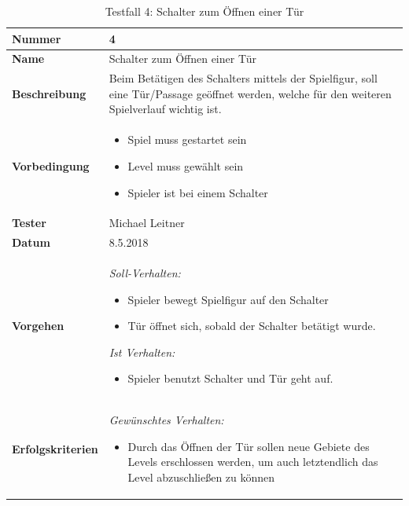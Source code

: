 \begin{table}

	\renewcommand{\arraystretch}{1.5}
	\begin{tabular}{|p{3.5cm}|p{11cm}|}
		
		\hline 
		\textbf{Nummer} & 4 \\ 
		\hline 
		\textbf{Name} & {\large Schalter zum Öffnen einer Tür} \\ 
		\hline 
		\textbf{Beschreibung} & 
		Beim Betätigen des Schalters mittels der Spielfigur, soll eine Tür/Passage geöffnet werden, welche für den weiteren Spielverlauf wichtig ist. \\ 
		\hline 
		\textbf{Vorbedingung} & 
		\begin{itemize}
			\setlength{\itemsep}{1pt}
			\setlength{\parskip}{0.5pt}
			\item Spiel muss gestartet sein
			\item Level muss gewählt sein
			\item Spieler ist bei einem Schalter
		\end{itemize} \\ 
		\hline 
		\textbf{Tester} & Michael Leitner \\ 
		\hline 
		\textbf{Datum} & 8.5.2018 \\ 
		\hline 
		\textbf{Vorgehen} & 
		\textit{Soll-Verhalten:}
		\begin{itemize}
			\setlength{\itemsep}{1pt}
			\setlength{\parskip}{0.5pt}
			\item Spieler bewegt Spielfigur auf den Schalter
			\item Tür öffnet sich, sobald der Schalter betätigt wurde.\newline
		\end{itemize}  
		
		
		\textit{Ist Verhalten:}
		\begin{itemize}
			\setlength{\itemsep}{1pt}
			\setlength{\parskip}{0.5pt}
			\item Spieler benutzt Schalter und Tür geht auf. 
		\end{itemize}\\ 
		\hline 
		\textbf{Erfolgskriterien} & 
		\textit{Gewünschtes Verhalten:}
		\begin{itemize}
			\setlength{\itemsep}{1pt}
			\setlength{\parskip}{0.5pt}
			\item Durch das Öffnen der Tür sollen neue Gebiete des Levels erschlossen werden, um auch letztendlich das Level abzuschließen zu können
		\end{itemize} \\ 
		\hline 
	\end{tabular} 
	\caption{Testfall 4: Schalter zum Öffnen einer Tür}
\end{table}


